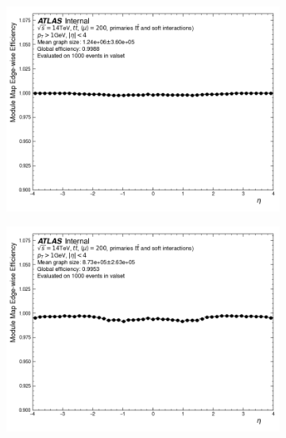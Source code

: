 \begin{figure}[h!]
\begin{subfigure}[b]{0.49\textwidth}
    \centering
    \includegraphics[width=\textwidth]{figures/gnn_MM_UNCLEANED_MINMAX_WITHOUT_CONCAT_LATENT128_LN/graph_construction_edgewise_efficiency_eta.png}
    \caption{}
    \label{subfig:mm-eff-minmax-eta}
\end{subfigure}
\begin{subfigure}[b]{0.49\textwidth}
    \centering
    \includegraphics[width=\textwidth]{figures/gnn_MM_UNCLEANED_MEANRMS_WITHOUT_CONCAT_LATENT128_LN/graph_construction_edgewise_efficiency_eta.png}
    \caption{}
    \label{subfig:mm-eff-meanrms-eta}
\end{subfigure}


\end{figure}
